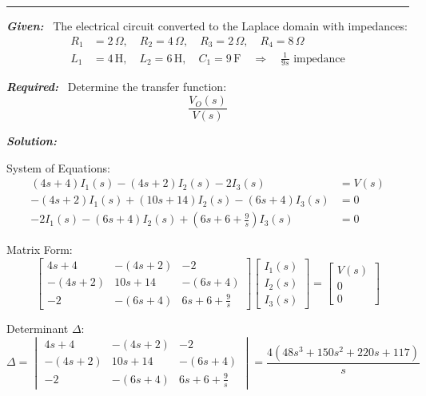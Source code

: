 \documentclass[11pt]{article}
\begin{document}
\noindent\rule{\textwidth}{1pt}

\vspace{12pt}


\noindent\textbf{\textit{Given:}}  
\ The electrical circuit converted to the Laplace domain with impedances:
\[
\begin{aligned}
R_1 &= 2\, \Omega, \quad R_2 = 4\, \Omega, \quad R_3 = 2\, \Omega, \quad R_4 = 8\, \Omega \\
L_1 &= 4\, \text{H}, \quad L_2 = 6\, \text{H}, \quad C_1 = 9\, \text{F} \quad \Rightarrow \quad \frac{1}{9s} \text{ impedance}
\end{aligned}
\]

 
\vspace{12pt}

\noindent
\textbf{\textit{Required:}}
    \ Determine the transfer function:
    \[
    \frac{V_O(s)}{V(s)}
    \]

\vspace{12pt}

\noindent \textbf{\textit{Solution:}}

\vspace{12pt}

{System of Equations:}
\[
\begin{aligned}
(4s + 4) I_1(s) - (4s + 2) I_2(s) - 2 I_3(s) &= V(s) \\
-(4s + 2) I_1(s) + (10s + 14) I_2(s) - (6s + 4) I_3(s) &= 0 \\
-2 I_1(s) - (6s + 4) I_2(s) + \left(6s + 6 + \frac{9}{s}\right) I_3(s) &= 0
\end{aligned}
\]

\bigskip

{Matrix Form:}
\[
\begin{bmatrix}
4s + 4 & -(4s + 2) & -2 \\
-(4s + 2) & 10s + 14 & -(6s + 4) \\
-2 & -(6s + 4) & 6s + 6 + \frac{9}{s}
\end{bmatrix}
\begin{bmatrix}
I_1(s) \\ I_2(s) \\ I_3(s)
\end{bmatrix}
=
\begin{bmatrix}
V(s) \\ 0 \\ 0
\end{bmatrix}
\]

\bigskip

{Determinant \( \Delta \):}
\[
\Delta = 
\begin{vmatrix}
4s + 4 & -(4s + 2) & -2 \\
-(4s + 2) & 10s + 14 & -(6s + 4) \\
-2 & -(6s + 4) & 6s + 6 + \frac{9}{s}
\end{vmatrix}
= \frac{4\left(48s^3 + 150s^2 + 220s + 117\right)}{s}
\]
\end{document}
